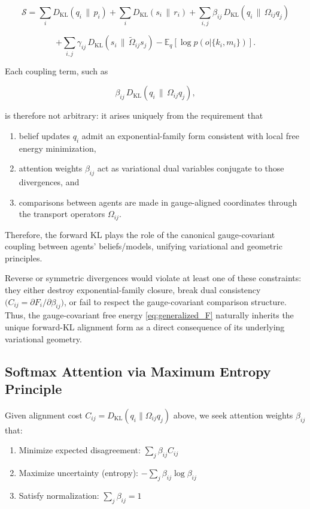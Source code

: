 \documentclass[11pt]{article}
\begin{document}
$$
\mathcal{S}
=\sum_i D_{\mathrm{KL}}(q_i \,\|\, p_i)
+ \sum_i D_{\mathrm{KL}}(s_i \,\|\, r_i)
+ \sum_{i,j}\beta_{ij}\,D_{\mathrm{KL}}(q_i \,\|\, \Omega_{ij} q_j) 
$$

$$
+ \sum_{i,j}\gamma_{ij}\,D_{\mathrm{KL}}(s_i \,\|\, \tilde{\Omega}_{ij}s_j)- \mathbb{E}_q[\log p(o|\{k_i,m_i\})].
$$

Each coupling term, such as

$$
\beta_{ij}\,D_{\mathrm{KL}}(q_i \,\|\, \Omega_{ij} q_j),
$$

is therefore not arbitrary: it arises uniquely from the requirement that

\begin{enumerate}
  \item belief updates $q_i$ admit an exponential-family form consistent with local free energy minimization,
  \item attention weights $\beta_{ij}$ act as variational dual variables conjugate to those divergences, and
  \item comparisons between agents are made in gauge-aligned coordinates through the transport operators $\Omega_{ij}$.
\end{enumerate}

Therefore, the forward KL plays the role of the canonical gauge-covariant coupling between agents' beliefs/models, unifying variational and geometric principles.

Reverse or symmetric divergences would violate at least one of these constraints: they either destroy exponential-family closure, break dual consistency $\big(C_{ij} = \partial F_i / \partial \beta_{ij}\big)$, or fail to respect the gauge-covariant comparison structure. Thus, the gauge-covariant free energy \eqref{eq:generalized_F} naturally inherits the unique forward-KL alignment form as a direct consequence of its underlying variational geometry.



\subsection{Softmax Attention via Maximum Entropy Principle}
Given alignment cost $C_{ij} = D_{\mathrm{KL}}(q_i \| \Omega_{ij}q_j)$ above, we seek attention weights $\beta_{ij}$ that:

\begin{enumerate}
  \item Minimize expected disagreement: $\sum_j \beta_{ij} C_{ij}$
  \item Maximize uncertainty (entropy): $-\sum_j \beta_{ij}\log\beta_{ij}$
  \item Satisfy normalization: $\sum_j \beta_{ij} = 1$
\end{enumerate}
\end{document}
